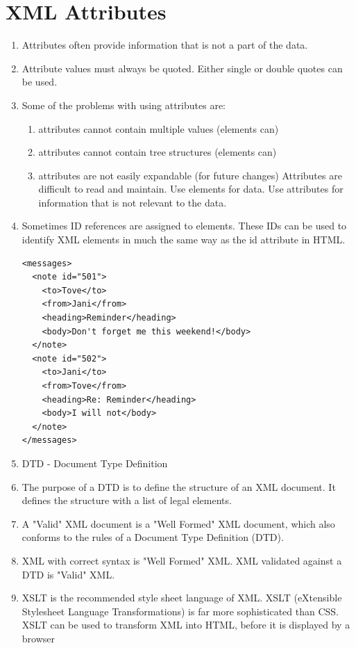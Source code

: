 \documentclass[a4paper,oneside]{book}
\begin{document}
\section{XML Attributes}
\begin{enumerate}
\item Attributes often provide information that is not a part of the data.
\item Attribute values must always be quoted. Either single or double quotes can be used.
\item Some of the problems with using attributes are:
\begin{enumerate}
\item attributes cannot contain multiple values (elements can)
\item attributes cannot contain tree structures (elements can)
\item attributes are not easily expandable (for future changes)
Attributes are difficult to read and maintain. Use elements for data. Use attributes for information that is not relevant to the data.
\end{enumerate}
\item Sometimes ID references are assigned to elements. These IDs can be used to identify XML elements in much the same way as the id attribute in HTML. 
\begin{verbatim}
<messages>
  <note id="501">
    <to>Tove</to>
    <from>Jani</from>
    <heading>Reminder</heading>
    <body>Don't forget me this weekend!</body>
  </note>
  <note id="502">
    <to>Jani</to>
    <from>Tove</from>
    <heading>Re: Reminder</heading>
    <body>I will not</body>
  </note>
</messages>
\end{verbatim}
\item DTD - Document Type Definition 
\item The purpose of a DTD is to define the structure of an XML document. It defines the structure with a list of legal elements.
\item A "Valid" XML document is a "Well Formed" XML document, which also conforms to the rules of a Document Type Definition (DTD).
\item XML with correct syntax is "Well Formed" XML.
XML validated against a DTD is "Valid" XML.
\item XSLT is the recommended style sheet language of XML.
XSLT (eXtensible Stylesheet Language Transformations) is far more sophisticated than CSS.
XSLT can be used to transform XML into HTML, before it is displayed by a browser
\end{enumerate}
\end{document}
